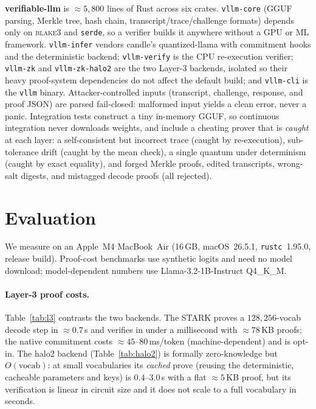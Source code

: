 \documentclass[11pt]{article}
\newcommand{\code}[1]{\texttt{#1}}
\begin{document}
\textbf{verifiable-llm} is ${\approx}5{,}800$ lines of Rust across six crates.
\code{vllm-core} (GGUF parsing, Merkle tree, hash chain, transcript/trace/challenge
formats) depends only on \textsc{blake3} and \code{serde}, so a verifier builds
it anywhere without a GPU or ML framework. \code{vllm-infer} vendors candle's
quantized-llama with commitment hooks and the deterministic backend;
\code{vllm-verify} is the CPU re-execution verifier; \code{vllm-zk} and
\code{vllm-zk-halo2} are the two Layer-3 backends, isolated so their heavy
proof-system dependencies do not affect the default build; and \code{vllm-cli}
is the \code{vllm} binary. Attacker-controlled inputs (transcript, challenge,
response, and proof JSON) are parsed fail-closed: malformed input yields a clean
error, never a panic. Integration tests construct a tiny in-memory GGUF, so
continuous integration never downloads weights, and include a cheating prover
that is \emph{caught} at each layer: a self-consistent but incorrect trace
(caught by re-execution), sub-tolerance drift (caught by the mean check), a
single quantum under determinism (caught by exact equality), and forged Merkle
proofs, edited transcripts, wrong-salt digests, and mistagged decode proofs (all
rejected).

\section{Evaluation}\label{sec:eval}

We measure on an Apple~M4 MacBook~Air (16\,GB, macOS~26.5.1, \code{rustc}~1.95.0,
release build). Proof-cost benchmarks use synthetic logits and need no model
download; model-dependent numbers use Llama-3.2-1B-Instruct Q4\_K\_M.

\paragraph{Layer-3 proof costs.} Table~\ref{tab:l3} contrasts the two backends.
The STARK proves a $128{,}256$-vocab decode step in ${\approx}0.7$\,s and
verifies in under a millisecond with ${\approx}78$\,KB proofs; the native
commitment costs ${\approx}45$--$80$\,ms/token (machine-dependent) and is
opt-in. The halo2 backend (Table~\ref{tab:halo2}) is formally zero-knowledge but
$O(\text{vocab})$: at small vocabularies its \emph{cached} prove (reusing the
deterministic, cacheable parameters and keys) is $0.4$--$3.0$\,s with a flat
${\approx}5$\,KB proof, but its verification is linear in circuit size and it
does not scale to a full vocabulary in seconds.
\end{document}
